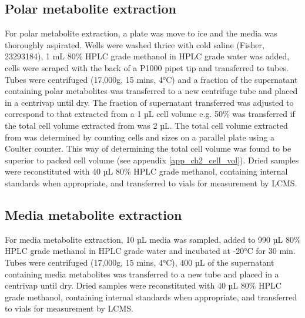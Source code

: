 \subsection{Polar metabolite extraction}
For polar metabolite extraction, a plate was move to ice and the media was thoroughly aspirated.
Wells were washed thrice with cold saline (Fisher, 23293184), 1 mL 80\% HPLC grade methanol in HPLC grade water was added, cells were scraped with the back of a P1000 pipet tip and transferred to tubes.
Tubes were centrifuged (17,000g, 15 mins, 4°C) and a fraction of the supernatant containing polar metabolites was transferred to a new centrifuge tube and placed in a centrivap until dry.
The fraction of supernatant transferred was adjusted to correspond to that extracted from a 1 µL cell volume e.g. 50\% was transferred if the total cell volume extracted from was 2 µL.
The total cell volume extracted from was determined by counting cells and sizes on a parallel plate using a Coulter counter.
This way of determining the total cell volume was found to be superior to packed cell volume (see appendix \ref{app_ch2_cell_vol}).
Dried samples were reconstituted with 40 µL 80\% HPLC grade methanol, containing internal standards when appropriate, and transferred to vials for measurement by LCMS.


\subsection{Media metabolite extraction}
For media metabolite extraction, 10 µL media was sampled, added to 990 µL 80\% HPLC grade methanol in HPLC grade water and incubated at -20°C for 30 min.
Tubes were centrifuged (17,000g, 15 mins, 4°C), 400 µL of the supernatant containing media metabolites was transferred to a new tube and placed in a centrivap until dry.
Dried samples were reconstituted with 40 µL 80\% HPLC grade methanol, containing internal standards when appropriate, and transferred to vials for measurement by LCMS.


